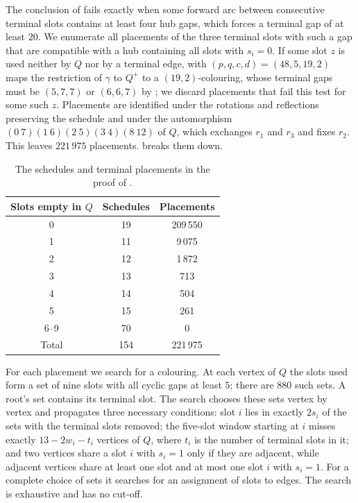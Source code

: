 \documentclass[11pt,colorlinks]{charlie}
\begin{document}
The conclusion of  fails exactly when some forward arc between consecutive terminal slots contains at least four hub gaps, which forces a terminal gap of at least $20$. We enumerate all placements of the three terminal slots with such a gap that are compatible with a hub containing all slots with $s_i=0$. If some slot $z$ is used neither by $Q$ nor by a terminal edge,  with $(p,q,c,d)=(48,5,19,2)$ maps the restriction of $\gamma$ to $Q^+$ to a $(19,2)$-colouring, whose terminal gaps must be $(5,7,7)$ or $(6,6,7)$ by ; we discard placements that fail this test for some such $z$. Placements are identified under the rotations and reflections preserving the schedule and under the automorphism $(0\ 7)(1\ 6)(2\ 5)(3\ 4)(8\ 12)$ of $Q$, which exchanges $r_1$ and $r_3$ and fixes $r_2$. This leaves $221\,975$ placements.  breaks them down.

\begin{table}[ht]
\centering\small
\begin{tabular}{@{}ccc@{}}
\toprule
Slots empty in $Q$ & Schedules & Placements \\
\midrule
0 & 19 & 209\,550 \\
1 & 11 & 9\,075 \\
2 & 12 & 1\,872 \\
3 & 13 & 713 \\
4 & 14 & 504 \\
5 & 15 & 261 \\
6--9 & 70 & 0 \\
\midrule
Total & 154 & 221\,975 \\
\bottomrule
\end{tabular}
\caption{The schedules and terminal placements in the proof of .}
\label{tab:fifth}
\end{table}

For each placement we search for a colouring. At each vertex of $Q$ the slots used form a set of nine slots with all cyclic gaps at least $5$; there are $880$ such sets. A root's set contains its terminal slot. The search chooses these sets vertex by vertex and propagates three necessary conditions: slot $i$ lies in exactly $2s_i$ of the sets with the terminal slots removed; the five-slot window starting at $i$ misses exactly $13-2w_i-t_i$ vertices of $Q$, where $t_i$ is the number of terminal slots in it; and two vertices share a slot $i$ with $s_i=1$ only if they are adjacent, while adjacent vertices share at least one slot and at most one slot $i$ with $s_i=1$. For a complete choice of sets it searches for an assignment of slots to edges. The search is exhaustive and has no cut-off.
\end{document}
